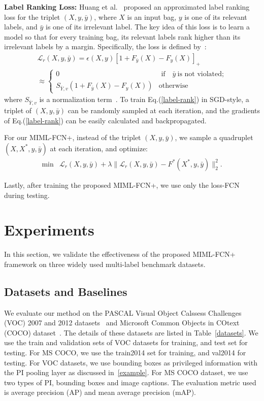 \documentclass[10pt,twocolumn,letterpaper]{article}
\begin{document}
\textbf{Label Ranking Loss:} Huang et al.~\cite{Huang2014}
proposed an approximated label ranking loss for the triplet
$(X,y,\bar{y})$, where $X$ is an input bag, $y$ is one of its
relevant labels, and $\bar{y}$ is one of its irrelevant label. The
key idea of this loss is to learn a model so that for every
training bag, its relevant labels rank higher than its irrelevant
labels by a margin. Specifically, the loss is defined
by~\cite{Huang2014}:
\begin{multline}
\label{label-rank}
\mathcal{L}_{r}(X,y,\bar{y}) = \epsilon(X,y)\left[1+F_{\bar{y}}(X)-F_y(X) \right]_+ \\
\approx\begin{cases}
0 & \text{ if { }}  \bar{y} \ \text{is not violated;}\\
S_{\bar{Y},v}(1+F_{\bar{y}}(X)-F_y(X)) &\text{otherwise}
\end{cases}
\end{multline}
where $S_{\bar{Y},v}$ is a normalization term~\cite{Huang2014}. To
train Eq.(\ref{label-rank}) in SGD-style, a triplet of
$(X,y,\bar{y})$ can be randomly sampled at  each iteration, and
the gradients of Eq.(\ref{label-rank}) can be easily calculated
and backpropagated.

For our \textsc{MIML-FCN+}, instead of the triplet
$(X,y,\bar{y})$, we sample a quadruplet  $(X,X^*,y,\bar{y})$ at
each iteration, and optimize:
\begin{equation}
\label{label-rank-obj}
\begin{matrix}
\min & \mathcal{L}_{r}(X,y,\bar{y}) +
\lambda\|\mathcal{L}_{r}(X,y,\bar{y}) -F^*(X^*,y,\bar{y})\|_2^2.
\end{matrix}
\end{equation}

Lastly, after training the proposed MIML-FCN+, we use only the loss-FCN during testing.

\section{Experiments}
\label{exp} In this section, we validate the effectiveness of the
proposed \textsc{MIML-FCN+} framework on three widely used
multi-label benchmark datasets.

\subsection{Datasets and Baselines}
We evaluate our method on the PASCAL Visual Object Calssess
Challenges (VOC) 2007 and 2012 datasets~\cite{VOC} and Microsoft
Common Objects in COtext (COCO) dataset~\cite{COCO}. The details
of these datasets are listed in Table~\ref{datasets}. We use the
train and validation sets of \textsc{VOC} datasets for training,
and test set for testing. For \textsc{MS COCO}, we use the
train2014 set for training, and val2014 for testing. For
\textsc{VOC} datasets, we use bounding boxes as privileged
information with the PI pooling layer as discussed
in~\ref{example}. For \textsc{MS COCO} dataset, we use two types
of PI, bounding boxes and image captions. The evaluation metric
used is average precision (AP) and mean average precision (mAP).
\end{document}
